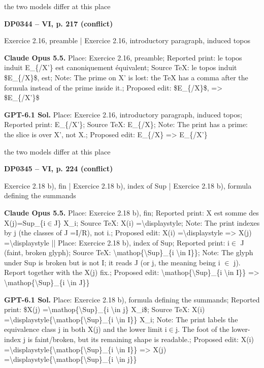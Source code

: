 the two models differ at this place\par
\par\noindent\hypertarget{DP0344}{}\textbf{DP0344 -- VI, p. 217 (conflict)}\par
Exercice 2.16, preamble | Exercice 2.16, introductory paragraph, induced topos\par
\textbf{Claude Opus 5.5.} Place: Exercice 2.16, preamble; Reported print: le topos induit E\_\{/X'\} est canoniquement équivalent; Source TeX: le topos induit \$E\_\{/X\}\$, est; Note: The prime on X' is lost: the TeX has a comma after the formula instead of the prime inside it.; Proposed edit: \$E\_\{/X\}\$, =\allowbreak > \$E\_\{/X'\}\$\par
\textbf{GPT-6.1 Sol.} Place: Exercice 2.16, introductory paragraph, induced topos; Reported print: E\_\{/X'\}; Source TeX: E\_\{/X\}; Note: The print has a prime: the slice is over X', not X.; Proposed edit: E\_\{/X\} =\allowbreak > E\_\{/X'\}\par
the two models differ at this place\par
\par\noindent\hypertarget{DP0345}{}\textbf{DP0345 -- VI, p. 224 (conflict)}\par
Exercice 2.18 b), fin | Exercice 2.18 b), index of Sup | Exercice 2.18 b), formula defining the summands\par
\textbf{Claude Opus 5.5.} Place: Exercice 2.18 b), fin; Reported print: X est somme des X(j)=\allowbreak  Sup\_\{i\ensuremath{\in}J\} X\_i; Source TeX: X(i) =\allowbreak  \textbackslash{}displaystyle; Note: The print indexes by j (the classes of J =\allowbreak  I/R), not i.; Proposed edit: X(i) =\allowbreak  \textbackslash{}displaystyle =\allowbreak > X(j) =\allowbreak  \textbackslash{}displaystyle || Place: Exercice 2.18 b), index of Sup; Reported print: i\ensuremath{\in} J (faint, broken glyph); Source TeX: \textbackslash{}mathop\{\textbackslash{}Sup\}\_\{i \textbackslash{}in I\}\}; Note: The glyph under Sup is broken but is not I; it reads J (or j, the meaning being i \ensuremath{\in} j). Report together with the X(j) fix.; Proposed edit: \textbackslash{}mathop\{\textbackslash{}Sup\}\_\{i \textbackslash{}in I\}\} =\allowbreak > \textbackslash{}mathop\{\textbackslash{}Sup\}\_\{i \textbackslash{}in J\}\}\par
\textbf{GPT-6.1 Sol.} Place: Exercice 2.18 b), formula defining the summands; Reported print: \$X(j) =\allowbreak  \textbackslash{}mathop\{\textbackslash{}Sup\}\_\{i \textbackslash{}in j\} X\_i\$; Source TeX: X(i) =\allowbreak  \textbackslash{}displaystyle\{\textbackslash{}mathop\{\textbackslash{}Sup\}\_\{i \textbackslash{}in I\}\} X\_i; Note: The print labels the equivalence class j in both X(j) and the lower limit i\ensuremath{\in}j. The foot of the lower-index j is faint/broken, but its remaining shape is readable.; Proposed edit: X(i) =\allowbreak  \textbackslash{}displaystyle\{\textbackslash{}mathop\{\textbackslash{}Sup\}\_\{i \textbackslash{}in I\}\} =\allowbreak > X(j) =\allowbreak  \textbackslash{}displaystyle\{\textbackslash{}mathop\{\textbackslash{}Sup\}\_\{i \textbackslash{}in j\}\}\par
